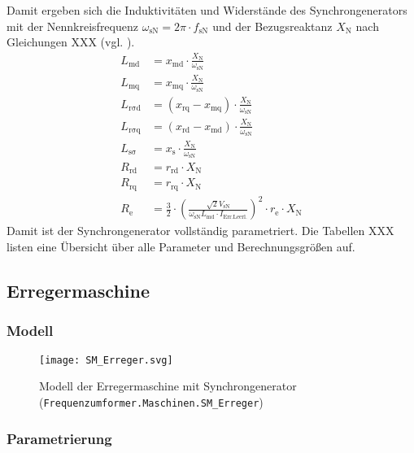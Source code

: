 Damit ergeben sich die Induktivitäten und Widerstände des
Synchrongenerators mit der Nennkreisfrequenz
\(\omega_{\mathrm{sN}}=2\pi\cdot f_{\mathrm{sN}}\) und der
Bezugsreaktanz \(X_{\mathrm{N}}\) nach Gleichungen XXX (vgl.
\cite[S.265f.]{kralModelicaObjektorientierteModellbildung2019}).
\begin{align}
L_{\mathrm{md}} &= x_{\mathrm{md}}\cdot \frac{X_{\mathrm{N}}}{\omega_{\mathrm{sN}}} \\
L_{\mathrm{mq}} &= x_{\mathrm{mq}}\cdot \frac{X_{\mathrm{N}}}{\omega_{\mathrm{sN}}} \\
L_{\mathrm{r \sigma d}} &= (x_{\mathrm{rq}}-x_{\mathrm{mq}})\cdot \frac{X_{\mathrm{N}}}{\omega_{\mathrm{sN}}} \\
L_{\mathrm{r \sigma q}} &= (x_{\mathrm{rd}}-x_{\mathrm{md}})\cdot \frac{X_{\mathrm{N}}}{\omega_{\mathrm{sN}}} \\
L_{\mathrm{s \sigma}} &= x_{\mathrm{s}}\cdot \frac{X_{\mathrm{N}}}{\omega_{\mathrm{sN}}} \\
R_{\mathrm{rd}} &= r_{\mathrm{rd}}\cdot X_{\mathrm{N}} \\
R_{\mathrm{rq}} &= r_{\mathrm{rq}}\cdot X_{\mathrm{N}} \\
R_{\mathrm{e}} &= \frac{3}{2}\cdot \left(\frac{\sqrt{2}V_{\mathrm{sN}}}{\omega_{\mathrm{sN}}L_{\mathrm{md}}\cdot I_{\mathrm{Err. Leerl.}}}\right)^2\cdot r_{\mathrm{e}}\cdot X_{\mathrm{N}}
\end{align}
Damit ist der Synchrongenerator vollständig parametriert. Die Tabellen
XXX listen eine Übersicht über alle Parameter und Berechnungsgrößen auf.

\hypertarget{erregermaschine}{%
\subsection{Erregermaschine}\label{erregermaschine}}

\hypertarget{modell-2}{%
\subsubsection{Modell}\label{modell-2}}

\begin{figure}
\centering
\texttt{[image: SM\_Erreger.svg]}
\caption{Modell der Erregermaschine mit Synchrongenerator
(\texttt{Frequenzumformer.Maschinen.SM\_Erreger})}
\end{figure}

\hypertarget{parametrierung-2}{%
\subsubsection{Parametrierung}\label{parametrierung-2}}


